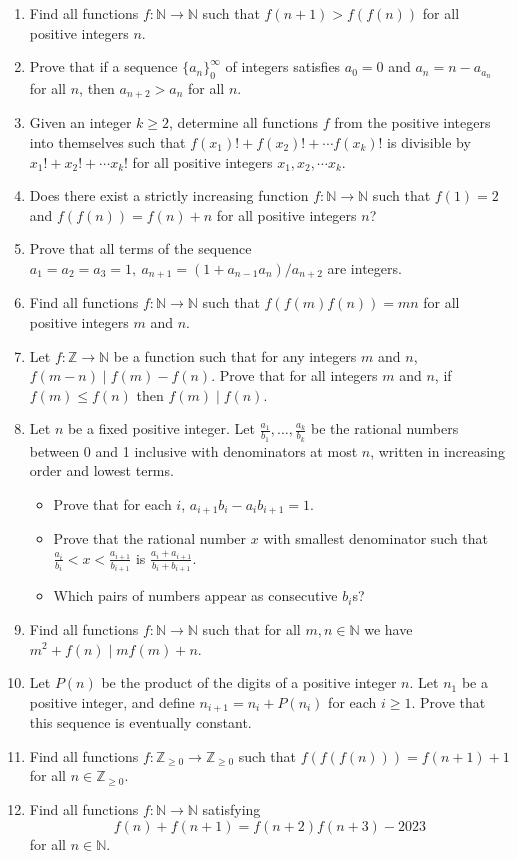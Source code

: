 \documentclass{article}
\newcommand\Nn{\mathbb{N}}
\newcommand\Zz{\mathbb{Z}}
\begin{document}
\begin{enumerate}
  \item Find all functions $f:\Nn\to\Nn$ such that $f(n+1)>f(f(n))$ for all
    positive integers $n$.
  \item Prove that if a sequence $\{a_n\}_0^\infty$ of integers satisfies
    $a_0=0$ and $a_n=n-a_{a_n}$ for all $n$, then $a_{n+2}>a_n$ for all $n$.
  \item Given an integer $k\geq 2$, determine all functions $f$ from the
    positive integers into themselves such that $f(x_1)!+f(x_2)!+\cdots f(x_k)!$
    is divisible by $x_1!+x_2!+\cdots x_k!$ for all positive integers
    $x_1,x_2,\cdots x_k$.
  \item Does there exist a strictly increasing function $f:\Nn\to\Nn$ such that
    $f(1)=2$ and $f(f(n))=f(n)+n$ for all positive integers $n$?
  \item Prove that all terms of the sequence $a_1=a_2=a_3=1,\
    a_{n+1}=(1+a_{n-1}a_n)/a_{n+2}$ are integers.
  \item Find all functions $f:\Nn\to\Nn$ such that $f(f(m)f(n))=mn$ for all
    positive integers $m$ and $n$.
  \item Let $f:\Zz\to\Nn$ be a function such that for any integers $m$ and $n$,
    $f(m-n)\mid f(m)-f(n)$. Prove that for all integers $m$ and $n$, if $f(m)\le
    f(n)$ then $f(m)\mid f(n)$.
  \item Let $n$ be a fixed positive integer. Let
    $\frac{a_1}{b_1},\ldots,\frac{a_k}{b_k}$ be the rational numbers between 0
    and 1 inclusive with denominators at most $n$, written in increasing order
    and lowest terms.
    \begin{itemize}
      \item Prove that for each $i$, $a_{i+1}b_i-a_i b_{i+1}=1$.
      \item Prove that the rational number $x$ with smallest denominator such
        that $\frac{a_i}{b_i}<x<\frac{a_{i+1}}{b_{i+1}}$ is
        $\frac{a_i+a_{i+1}}{b_i+b_{i+1}}$. 
      \item Which pairs of numbers appear as consecutive $b_i$s?
    \end{itemize}
  \item Find all functions $f:\Nn\to\Nn$ such that for all $m, n\in\Nn$ we have
    $m^2+f(n)\mid mf(m)+n$.
  \item Let $P(n)$ be the product of the digits of a positive integer $n$.
    Let $n_1$ be a positive integer, and define $n_{i+1}=n_i+P(n_i)$ for each
    $i\ge 1$. Prove that this sequence is eventually constant.
  \item Find all functions $f:\Zz_{\ge 0}\to \Zz_{\ge 0}$ such that
    $f(f(f(n)))=f(n+1)+1$ for all $n\in\Zz_{\ge 0}$.
  \item Find all functions $f:\mathbb N\to\mathbb N$ satisfying 
    \[f(n)+f(n+1)=f(n+2)f(n+3)-2023\]
    for all $n\in\mathbb N$.
\end{enumerate}
\newpage
\end{document}
